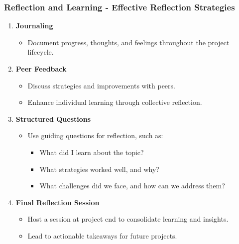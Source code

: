 \documentclass[aspectratio=169]{beamer}
\begin{document}
\begin{frame}[fragile]
    \frametitle{Reflection and Learning - Effective Reflection Strategies}
    \begin{enumerate}
        \item \textbf{Journaling}
        \begin{itemize}
            \item Document progress, thoughts, and feelings throughout the project lifecycle.
        \end{itemize}

        \item \textbf{Peer Feedback}
        \begin{itemize}
            \item Discuss strategies and improvements with peers.
            \item Enhance individual learning through collective reflection.
        \end{itemize}

        \item \textbf{Structured Questions}
        \begin{itemize}
            \item Use guiding questions for reflection, such as:
            \begin{itemize}
                \item What did I learn about the topic?
                \item What strategies worked well, and why?
                \item What challenges did we face, and how can we address them?
            \end{itemize}
        \end{itemize}

        \item \textbf{Final Reflection Session}
        \begin{itemize}
            \item Host a session at project end to consolidate learning and insights.
            \item Lead to actionable takeaways for future projects.
        \end{itemize}
    \end{enumerate}
\end{frame}
\end{document}
